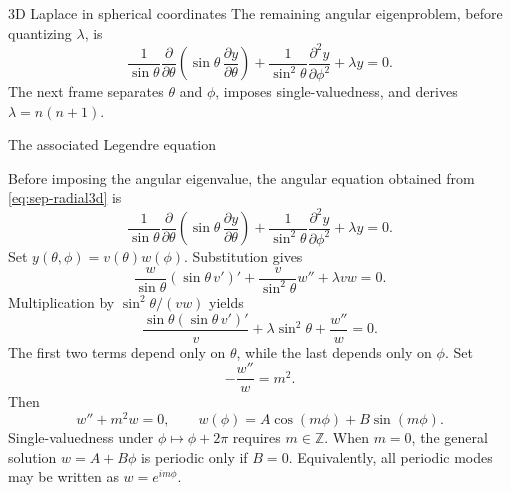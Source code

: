 \documentclass[11pt]{beamer}
\begin{document}
\begin{frame}[allowframebreaks]{3D Laplace in spherical coordinates}
The remaining angular eigenproblem, before quantizing $\lambda$, is
\[
  \frac{1}{\sin\theta}
    \frac{\partial}{\partial\theta}
      \left(\sin\theta\,\frac{\partial y}{\partial\theta}\right)
  +\frac{1}{\sin^2\theta}\frac{\partial^2y}{\partial\phi^2}
  +\lambda y=0.
\]
The next frame separates $\theta$ and $\phi$, imposes single-valuedness, and
derives $\lambda=n(n+1)$.
\end{frame}

\begin{frame}[allowframebreaks]{The associated Legendre equation}
\footnotesize

Before imposing the angular eigenvalue, the angular equation obtained from
\eqref{eq:sep-radial3d} is
\[
  \frac{1}{\sin\theta}
    \frac{\partial}{\partial\theta}
      \left(\sin\theta\,\frac{\partial y}{\partial\theta}\right)
  +\frac{1}{\sin^2\theta}\frac{\partial^2y}{\partial\phi^2}
  +\lambda y=0.
\]
Set $y(\theta,\phi)=v(\theta)w(\phi)$.  Substitution gives
\[
  \frac{w}{\sin\theta}(\sin\theta\,v')'
  +\frac{v}{\sin^2\theta}w''
  +\lambda vw=0.
\]
Multiplication by $\sin^2\theta/(vw)$ yields
\[
  \frac{\sin\theta(\sin\theta\,v')'}{v}
  +\lambda\sin^2\theta
  +\frac{w''}{w}=0.
\]
The first two terms depend only on $\theta$, while the last depends only on
$\phi$.  Set
\[
  -\frac{w''}{w}=m^2.
\]
Then
\[
  w''+m^2w=0,
  \qquad
  w(\phi)=A\cos(m\phi)+B\sin(m\phi).
\]
Single-valuedness under $\phi\mapsto\phi+2\pi$ requires $m\in\mathbb Z$.
When $m=0$, the general solution $w=A+B\phi$ is periodic only if $B=0$.
Equivalently, all periodic modes may be written as $w=e^{im\phi}$.


\end{frame}
\end{document}

